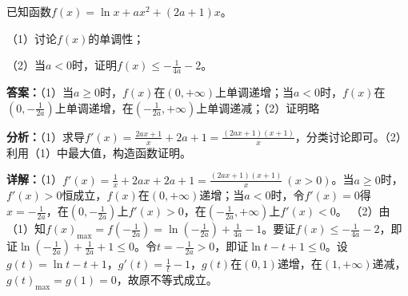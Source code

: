 \begin{question}[points=12]
已知函数$f(x)=\ln x+ax^2+(2a+1)x$。

（1）讨论$f(x)$的单调性；

（2）当$a<0$时，证明$f(x)\le -\frac{1}{4a}-2$。
\begin{solution}
\textbf{答案：}（1）当$a\ge 0$时，$f(x)$在$(0,+\infty)$上单调递增；当$a<0$时，$f(x)$在$(0,-\frac{1}{2a})$上单调递增，在$(-\frac{1}{2a},+\infty)$上单调递减；（2）证明略

\textbf{分析：}（1）求导$f'(x)=\frac{2ax+1}{x}+2a+1=\frac{(2ax+1)(x+1)}{x}$，分类讨论即可。（2）利用（1）中最大值，构造函数证明。

\textbf{详解：}（1）$f'(x)=\frac{1}{x}+2ax+2a+1=\frac{(2ax+1)(x+1)}{x}\ (x>0)$。当$a\ge 0$时，$f'(x)>0$恒成立，$f(x)$在$(0,+\infty)$递增；当$a<0$时，令$f'(x)=0$得$x=-\frac{1}{2a}$，在$(0,-\frac{1}{2a})$上$f'(x)>0$，在$(-\frac{1}{2a},+\infty)$上$f'(x)<0$。
（2）由（1）知$f(x)_{\max}=f(-\frac{1}{2a})=\ln(-\frac{1}{2a})+\frac{1}{4a}-1$。要证$f(x)\le -\frac{1}{4a}-2$，即证$\ln(-\frac{1}{2a})+\frac{1}{2a}+1\le 0$。令$t=-\frac{1}{2a}>0$，即证$\ln t-t+1\le 0$。设$g(t)=\ln t-t+1$，$g'(t)=\frac{1}{t}-1$，$g(t)$在$(0,1)$递增，在$(1,+\infty)$递减，$g(t)_{\max}=g(1)=0$，故原不等式成立。
\end{solution}
\end{question}

